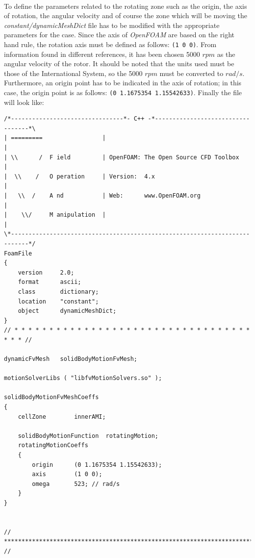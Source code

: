 \paragraph{}To define the parameters related to the rotating zone such as the origin, the axis of rotation, the angular velocity and of course the zone which will be moving the \textit{constant/dynamicMeshDict} file has to be modified with the appropriate parameters for the case. Since the axis of \textit{OpenFOAM} are based on the right hand rule, the rotation axis must be defined as follows: \texttt{(1 0 0)}. From information found in different references, it has been chosen 5000 $rpm$ as the angular velocity of the rotor. It should be noted that the units used must be those of the International System, so the 5000 $rpm$ must be converted to $rad/s$. Furthermore, an origin point has to be indicated in the axis of rotation; in this case, the origin point is as follows: \texttt{(0 1.1675354 1.15542633)}. Finally the file will look like:


\begin{footnotesize}
\begin{verbatim}
/*--------------------------------*- C++ -*----------------------------------*\
| =========                 |                                                 |
| \\      /  F ield         | OpenFOAM: The Open Source CFD Toolbox           |
|  \\    /   O peration     | Version:  4.x                                   |
|   \\  /    A nd           | Web:      www.OpenFOAM.org                      |
|    \\/     M anipulation  |                                                 |
\*---------------------------------------------------------------------------*/
FoamFile
{
    version     2.0;
    format      ascii;
    class       dictionary;
    location    "constant";
    object      dynamicMeshDict;
}
// * * * * * * * * * * * * * * * * * * * * * * * * * * * * * * * * * * * * * //

dynamicFvMesh   solidBodyMotionFvMesh;

motionSolverLibs ( "libfvMotionSolvers.so" );

solidBodyMotionFvMeshCoeffs
{
    cellZone        innerAMI;

    solidBodyMotionFunction  rotatingMotion;
    rotatingMotionCoeffs
    {
        origin      (0 1.1675354 1.15542633);
        axis        (1 0 0);
        omega       523; // rad/s
    }
}


// ************************************************************************* //
\end{verbatim}
\end{footnotesize}

